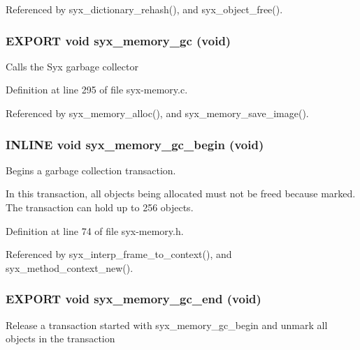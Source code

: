 Referenced by syx\_\-dictionary\_\-rehash(), and syx\_\-object\_\-free().\hypertarget{syx-memory_8h_a5c424be57b4ec70548f0162b9d8792d}{
\subsubsection{\setlength{\rightskip}{0pt plus 5cm}EXPORT void syx\_\-memory\_\-gc (void)}}
\label{syx-memory_8h_a5c424be57b4ec70548f0162b9d8792d}


Calls the Syx garbage collector 

Definition at line 295 of file syx-memory.c.

Referenced by syx\_\-memory\_\-alloc(), and syx\_\-memory\_\-save\_\-image().\hypertarget{syx-memory_8h_ccbca387b22bf3764007fa893f78cefd}{
\subsubsection{\setlength{\rightskip}{0pt plus 5cm}INLINE void syx\_\-memory\_\-gc\_\-begin (void)}}
\label{syx-memory_8h_ccbca387b22bf3764007fa893f78cefd}


Begins a garbage collection transaction.

In this transaction, all objects being allocated must not be freed because marked. The transaction can hold up to 256 objects. 

Definition at line 74 of file syx-memory.h.

Referenced by syx\_\-interp\_\-frame\_\-to\_\-context(), and syx\_\-method\_\-context\_\-new().\hypertarget{syx-memory_8h_e191746fd44dca483c40c1b06454c357}{
\subsubsection{\setlength{\rightskip}{0pt plus 5cm}EXPORT void syx\_\-memory\_\-gc\_\-end (void)}}
\label{syx-memory_8h_e191746fd44dca483c40c1b06454c357}


Release a transaction started with syx\_\-memory\_\-gc\_\-begin and unmark all objects in the transaction 

